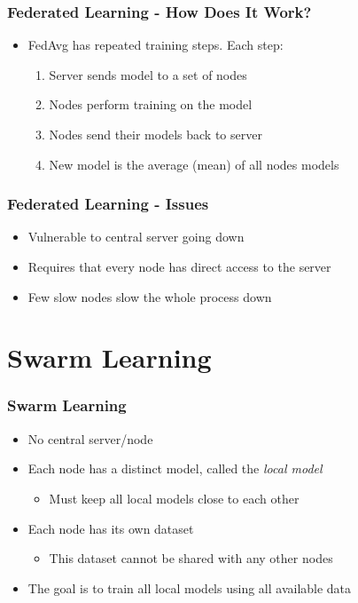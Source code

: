 \documentclass{beamer}
\begin{document}
	\begin{frame}
		\frametitle{Federated Learning - How Does It Work?}
		\begin{itemize}
			\item FedAvg has repeated training steps. Each step:
			\begin{enumerate}
				\item Server sends model to a set of nodes
				\item Nodes perform training on the model
				\item Nodes send their models back to server
				\item New model is the average (mean) of all nodes models
			\end{enumerate}
		\end{itemize}
	\end{frame}

	\begin{frame}
		\frametitle{Federated Learning - Issues}
		\begin{itemize}
			\item Vulnerable to central server going down
			\item Requires that every node has direct access to the server
			\item Few slow nodes slow the whole process down
		\end{itemize}
	\end{frame}

	\section{Swarm Learning}

	\begin{frame}
		\frametitle{Swarm Learning}
		\begin{itemize}
			\item No central server/node
			\item Each node has a distinct model, called the \emph{local model}
			\begin{itemize}
				\item Must keep all local models close to each other
			\end{itemize}
			\item Each node has its own dataset
			\begin{itemize}
				\item This dataset cannot be shared with any other nodes
			\end{itemize}
			\item The goal is to train all local models using all available data
		\end{itemize}
	\end{frame}
\end{document}
